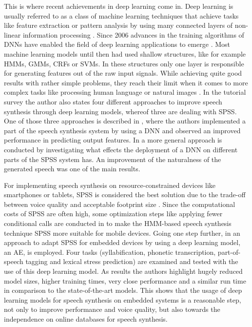 This is where recent achievements in deep learning come in. Deep learning is usually referred to as a class of machine learning techniques that achieve tasks like feature extraction or pattern analysis by using many connected layers of non-linear information processing \cite{ling:deep, li:survey}. Since 2006 advances in the training algorithms of \acp{DNN} have enabled the field of deep learning applications to emerge \cite{boros:robust}. Most machine learning models until then had used shallow structures, like for example \acp{HMM}, \acp{GMM}, \acp{CRF} or \acp{SVM}. In these structures only one layer is responsible for generating features out of the raw input signals. While achieving quite good results with rather simple problems, they reach their limit when it comes to more complex tasks like processing human language or natural images \cite{li:survey}. In the tutorial survey \cite{li:survey} the author also states four different approaches to improve speech synthesis through deep learning models, whereof three are dealing with \ac{SPSS}. One of those three approaches is described in \cite{zen:deepstatistical}, where the authors implemented a part of the speech synthesis system by using a \ac{DNN} and observed an improved performance in predicting output features. In \cite{hashimoto:effect} a more general approach is conducted by investigating what effects the deployment of a \ac{DNN} on different parts of the \ac{SPSS} system has. An improvement of the naturalness of the generated speech was one of the main results.

For implementing speech synthesis on resource-constrained devices like smartphones or tablets, \ac{SPSS} is considered the best solution due to the trade-off between voice quality and acceptable footprint size \cite{toth:optimizing}. Since the computational costs of \ac{SPSS} are often high, some optimization steps like applying fewer conditional calls are conducted in \cite{toth:optimizing} to make the \ac{HMM}-based speech synthesis technique \ac{SPSS} more suitable for mobile devices. Going one step further, in \cite{boros:robust} an approach to adapt \ac{SPSS} for embedded devices by using a deep learning model, an \ac{AE}, is employed. Four tasks (syllabification, phonetic transcription, part-of-speech tagging and lexical stress prediction) are examined and tested with the use of this deep learning model. As results the authors highlight hugely reduced model sizes, higher training times, very close performance and a similar run time in comparison to the state-of-the-art models. This shows that the usage of deep learning models for speech synthesis on embedded systems is a reasonable step, not only to improve performance and voice quality, but also towards the independence on online databases for speech synthesis.

